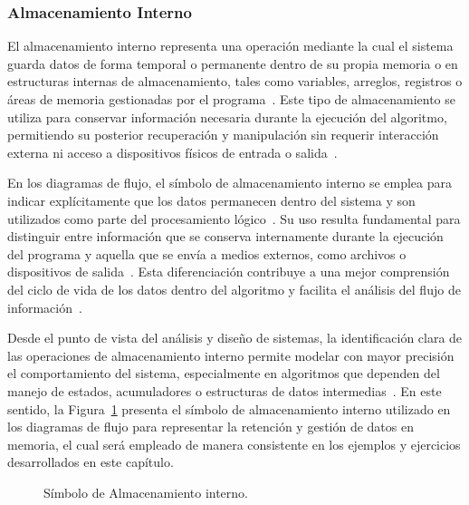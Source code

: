 \documentclass[12pt,twoside]{book}
\begin{document}
					\subsubsection{Almacenamiento Interno}
						\noindent
						El almacenamiento interno representa una operación mediante la cual el sistema guarda datos de forma temporal o permanente dentro de su propia memoria o en estructuras internas de almacenamiento, tales como variables, arreglos, registros o áreas de memoria gestionadas por el programa~\cite{Joyanes2007Fundamentos,Manzano2017Programacion}. Este tipo de almacenamiento se utiliza para conservar información necesaria durante la ejecución del algoritmo, permitiendo su posterior recuperación y manipulación sin requerir interacción externa ni acceso a dispositivos físicos de entrada o salida~\cite{Silberschatz2018Operating}.
						
						En los diagramas de flujo, el símbolo de almacenamiento interno se emplea para indicar explícitamente que los datos permanecen dentro del sistema y son utilizados como parte del procesamiento lógico~\cite{Joyanes2007Fundamentos,SmartDrawFlowchartSymbols}. Su uso resulta fundamental para distinguir entre información que se conserva internamente durante la ejecución del programa y aquella que se envía a medios externos, como archivos o dispositivos de salida~\cite{Manzano2017Programacion}. Esta diferenciación contribuye a una mejor comprensión del ciclo de vida de los datos dentro del algoritmo y facilita el análisis del flujo de información~\cite{Kendall2014Systems}.
						
						Desde el punto de vista del análisis y diseño de sistemas, la identificación clara de las operaciones de almacenamiento interno permite modelar con mayor precisión el comportamiento del sistema, especialmente en algoritmos que dependen del manejo de estados, acumuladores o estructuras de datos intermedias~\cite{Pressman2019Software}. En este sentido, la Figura~\ref{fig:DFAlmacenInterno} presenta el símbolo de almacenamiento interno utilizado en los diagramas de flujo para representar la retención y gestión de datos en memoria, el cual será empleado de manera consistente en los ejemplos y ejercicios desarrollados en este capítulo.
						
						\begin{figure}[h]
							\centering
							\caption{Símbolo de Almacenamiento interno.}
							\label{fig:DFAlmacenInterno}
						\end{figure}
				
\end{document}
